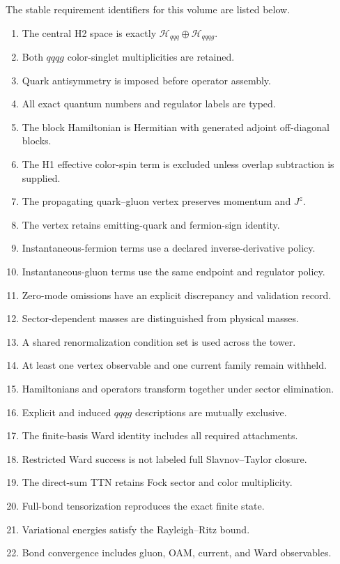 \documentclass[11pt]{article}
\newcommand{\Hil}{\mathcal H}
\newcommand{\Jz}{J^z}
\newcommand{\Hthree}{\Hil_{qqq}}
\newcommand{\Hfour}{\Hil_{qqqg}}
\begin{document}
The stable requirement identifiers for this volume are listed below.
\begin{enumerate}[label=\textbf{V9.\arabic*.}]
 \item The central H2 space is exactly \(\Hthree\oplus\Hfour\).
 \item Both \(qqqg\) color-singlet multiplicities are retained.
 \item Quark antisymmetry is imposed before operator assembly.
 \item All exact quantum numbers and regulator labels are typed.
 \item The block Hamiltonian is Hermitian with generated adjoint off-diagonal
 blocks.
 \item The H1 effective color-spin term is excluded unless overlap subtraction
 is supplied.
 \item The propagating quark--gluon vertex preserves momentum and \(\Jz\).
 \item The vertex retains emitting-quark and fermion-sign identity.
 \item Instantaneous-fermion terms use a declared inverse-derivative policy.
 \item Instantaneous-gluon terms use the same endpoint and regulator policy.
 \item Zero-mode omissions have an explicit discrepancy and validation record.
 \item Sector-dependent masses are distinguished from physical masses.
 \item A shared renormalization condition set is used across the tower.
 \item At least one vertex observable and one current family remain withheld.
 \item Hamiltonians and operators transform together under sector elimination.
 \item Explicit and induced \(qqqg\) descriptions are mutually exclusive.
 \item The finite-basis Ward identity includes all required attachments.
 \item Restricted Ward success is not labeled full Slavnov--Taylor closure.
 \item The direct-sum TTN retains Fock sector and color multiplicity.
 \item Full-bond tensorization reproduces the exact finite state.
 \item Variational energies satisfy the Rayleigh--Ritz bound.
 \item Bond convergence includes gluon, OAM, current, and Ward observables.

\end{enumerate}
\end{document}
